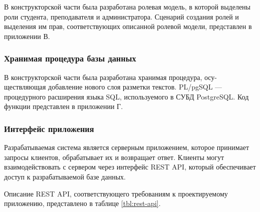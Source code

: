 
В конструкторской части была разработана ролевая модель, в которой выделены роли студента, преподавателя и администратора. Сценарий создания ролей и выделения им прав, соответствующих описанной ролевой модели, представлен в приложении В.


\subsubsection{Хранимая процедура базы данных}


В конструкторской части была разработана хранимая процедура, осу-\\ществляющая добавление нового слоя разметки текстов. PL/pgSQL \cite{plpgsql} --- процедурного расширения языка SQL, используемого в СУБД PostgreSQL. Код функции представлен в приложении Г.

\subsubsection{Интерфейс приложения}


Разрабатываемая система является серверным приложением, которое принимает запросы клиентов, обрабатывает их и возвращает ответ. Клиенты могут взаимодействовать с сервером через интерфейс REST API, который обеспечивает доступ к разрабатываемой базе данных. 


Описание REST API, соответствующего требованиям к проектируемому приложению, представлено в таблице \ref{tbl:rest-api}.

